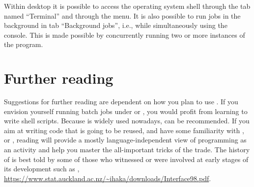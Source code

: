 \documentclass[krantz2]{krantz}\usepackage{knitr}
\begin{document}
Within \RStudio desktop it is possible to access the operating system shell through the tab named ``Terminal'' and through the menu. It is also possible to run jobs in the background in tab ``Background jobs'', i.e., while simultaneously using the \Rpgrm console. This is made possible by concurrently running two or more instances of the \Rpgrm program.

\section{Further reading}
Suggestions for further reading are dependent on how you plan to use \Rlang. If you envision yourself running batch jobs under  or , you would profit from learning to write shell scripts. Because  is widely used nowadays,  \autocite{Newham2005} can be recommended. If you aim at writing \Rlang code that is going to be reused, and have some familiarity with \Clang, \Cpplang or \javalang, reading  \autocite{Kernighan1999} will provide a mostly language-independent view of programming as an activity and help you master the all-important tricks of the trade. The history of \Rlang is best told by some of those who witnessed or were involved at early stages of its development such as \autocite{Chambers2016}, \autocite{Ihaka1998} \url{https://www.stat.auckland.ac.nz/~ihaka/downloads/Interface98.pdf}.




















\backmatter

\printbibliography

\printindex\label{idx:general}

\printindex[rindex]\label{idx:rindex}

\printindex[rcatsidx]\label{idx:rcats}

\printindex[faqindex]\label{idx:faqindex}
\end{document}
